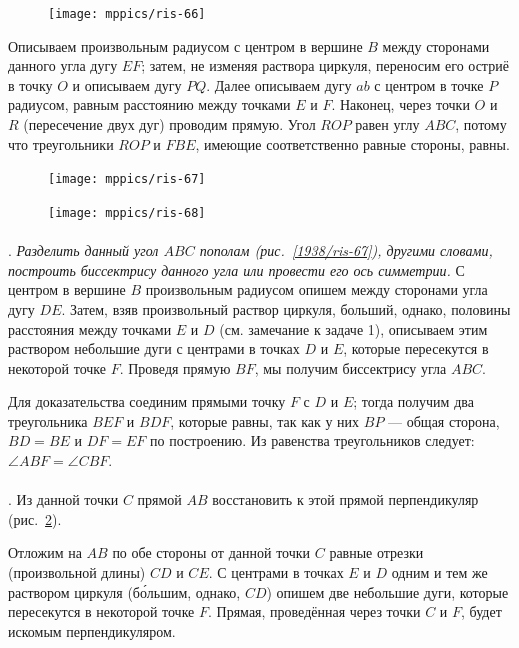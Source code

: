 \documentclass[oneside]{book}
\begin{document}
\begin{figure}[h!]
\centering
\texttt{[image: mppics/ris-66]}
\caption{}\label{1938/ris-66}
\end{figure}

Описываем произвольным радиусом с центром в вершине $B$ между сторонами данного угла дугу $EF$;
затем, не изменяя раствора циркуля, переносим его остриё в точку $O$ и описываем дугу $PQ$.
Далее описываем дугу $ab$ с центром в точке $P$ радиусом, равным расстоянию между точками $E$ и $F$.
Наконец, через точки $O$ и $R$ (пересечение двух дуг) проводим прямую.
Угол $ROP$ равен углу $ABC$, потому что треугольники $ROP$ и $FBE$, имеющие соответственно равные стороны, равны.

\begin{figure}
\vskip-4mm
\centering
\texttt{[image: mppics/ris-67]}
\caption{}\label{1938/ris-67}
\bigskip
\texttt{[image: mppics/ris-68]}
\caption{}\label{1938/ris-68}
\end{figure}

\paragraph{}\label{1938/64}
\mbox{.}
\emph{Разделить данный угол $ABC$ пополам (рис.~\ref{1938/ris-67}), другими словами, построить биссектрису данного угла или провести его ось симметрии.}
С центром в вершине $B$ произвольным радиусом опишем между сторонами угла дугу $DE$.
Затем, взяв произвольный раствор циркуля, больший, однако, половины расстояния между точками $E$ и $D$ (см. замечание к задаче 1), описываем этим раствором небольшие дуги с центрами в точках $D$ и $E$, которые пересекутся в некоторой точке $F$.
Проведя прямую $BF$, мы получим биссектрису угла $ABC$.


Для доказательства соединим прямыми точку $F$ с $D$ и $E$;
тогда получим два треугольника $BEF$ и $BDF$, которые равны, так как у них $BP$ — общая сторона, $BD=BE$ и $DF=EF$ по построению.
Из равенства треугольников следует:
$\angle ABF = \angle CBF$.

\paragraph{}\label{1938/65}
.
Из данной точки $C$ прямой $AB$ восстановить к этой прямой перпендикуляр (рис.~\ref{1938/ris-68}).

Отложим на $AB$ по обе стороны от данной точки $C$ равные отрезки (произвольной длины) $CD$ и $CE$.
С центрами в точках $E$ и $D$ одним и тем же раствором циркуля (б\'{о}льшим, однако, $CD$) опишем две небольшие дуги, которые пересекутся в некоторой точке $F$.
Прямая, проведённая через точки $C$ и $F$, будет искомым перпендикуляром.
\end{document}
